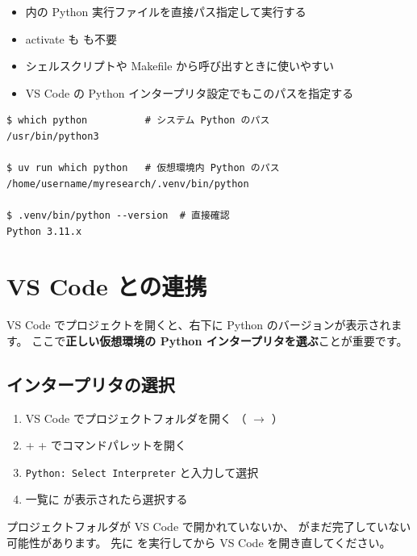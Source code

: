 \begin{itemize}
  \item {} 内の Python 実行ファイルを直接パス指定して実行する
  \item activate も  も不要
  \item シェルスクリプトや Makefile から呼び出すときに使いやすい
  \item VS Code の Python インタープリタ設定でもこのパスを指定する
\end{itemize}

\begin{wslbox}
\begin{lstlisting}[style=bash]
$ which python          # システム Python のパス
/usr/bin/python3

$ uv run which python   # 仮想環境内 Python のパス
/home/username/myresearch/.venv/bin/python

$ .venv/bin/python --version  # 直接確認
Python 3.11.x
\end{lstlisting}
\end{wslbox}

\section{VS Code との連携}

VS Code でプロジェクトを開くと、右下に Python のバージョンが表示されます。
ここで\textbf{正しい仮想環境の Python インタープリタを選ぶ}ことが重要です。

\subsection{インタープリタの選択}

\begin{enumerate}
  \item VS Code でプロジェクトフォルダを開く
    （ $\rightarrow$ ）
  \item {} +  +  でコマンドパレットを開く
  \item \texttt{Python: Select Interpreter} と入力して選択
  \item 一覧に  が表示されたら選択する
\end{enumerate}

\begin{notebox}
プロジェクトフォルダが VS Code で開かれていないか、
 がまだ完了していない可能性があります。
先に  を実行してから VS Code を開き直してください。
\end{notebox}

